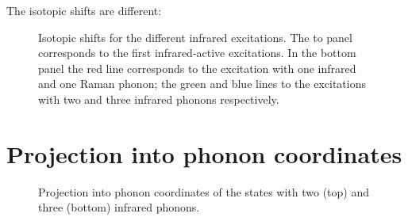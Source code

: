 The isotopic shifts are different:

\begin{figure}[h]
  \centering
  
  \caption[Isotopic shifts for the different infrared excitations.]
  {Isotopic shifts for the different infrared excitations.
  The to panel corresponds to the first infrared-active excitations.
  In the bottom panel the red line corresponds to the excitation with one infrared and one Raman phonon; the green and blue lines to the excitations with two and three infrared phonons respectively.}
  \label{fig:irIsot}
\end{figure}

\section{Projection into phonon coordinates}
\label{sec:irPhononProj}

\begin{figure}[h]
  \centering
  
  \caption{Projection into phonon coordinates of the states with two (top) and three (bottom) infrared phonons.}
  \label{fig:phononProj2-3ir}
\end{figure}
